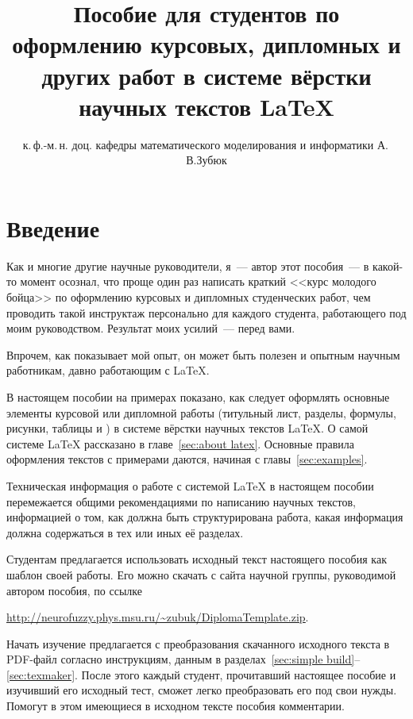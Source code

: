 \documentclass[a4paper, 14pt, reqno, oneside]{extbook}
\title{Пособие для студентов по оформлению курсовых, дипломных и других работ в системе вёрстки научных текстов \LaTeX}
\author{к.\,ф.-м.\,н. доц. кафедры математического моделирования и информатики А.\,В.\;Зубюк}
\date{\the\year}
\begin{document}
\maketitle

\listoftodos
\tableofcontents

\part*{Введение}

Как и многие другие научные руководители, я~--- автор этот пособия~--- в какой-то момент осознал, что проще один раз написать краткий <<курс молодого бойца>> по оформлению курсовых и дипломных студенческих работ, чем проводить такой инструктаж персонально для каждого студента, работающего под моим руководством. Результат моих усилий~--- перед вами.

Впрочем, как показывает мой опыт, он может быть полезен и опытным научным работникам, давно работающим с \LaTeX.

В настоящем пособии на примерах показано, как следует оформлять основные элементы курсовой или дипломной работы (титульный лист, разделы, формулы, рисунки, таблицы и \dr) в системе вёрстки научных текстов \LaTeX. О самой системе \LaTeX\xspace рассказано в главе~\ref{sec:about latex}. Основные правила оформления текстов с примерами даются, начиная с главы~\ref{sec:examples}.

Техническая информация о работе с системой \LaTeX\xspace в настоящем пособии перемежается общими рекомендациями по написанию научных текстов, информацией о том, как должна быть структурирована работа, какая информация должна содержаться в тех или иных её разделах.

Студентам предлагается использовать исходный текст настоящего пособия как шаблон своей работы. Его можно скачать с сайта научной группы, руководимой автором пособия, по ссылке\\
\centerline{\uline{\color{blue}\url{http://neurofuzzy.phys.msu.ru/~zubuk/DiplomaTemplate.zip}}.}

Начать изучение предлагается с преобразования скачанного исходного текста в PDF-файл согласно инструкциям, данным в разделах~\ref{sec:simple build}--\ref{sec:texmaker}.
После этого каждый студент, прочитавший настоящее пособие и изучивший его исходный тест, сможет легко преобразовать его под свои нужды. Помогут в этом имеющиеся в исходном тексте пособия комментарии.
\end{document}
